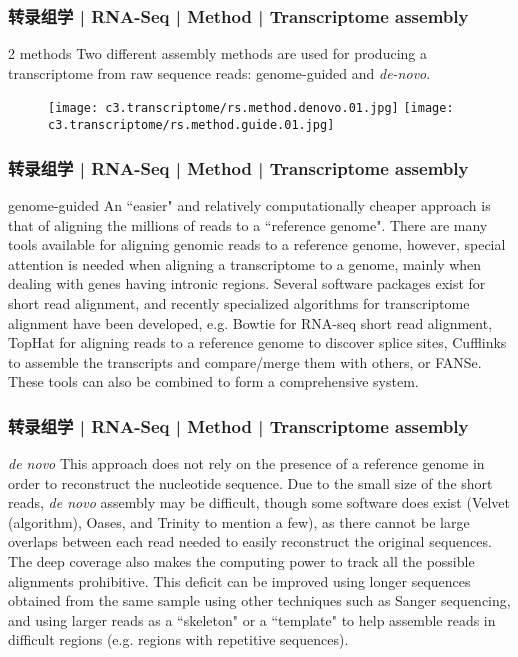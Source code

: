 \begin{frame}
  \frametitle{转录组学 | RNA-Seq | Method | Transcriptome assembly}
  \begin{block}{2 methods}
    Two different assembly methods are used for producing a transcriptome from raw sequence reads: genome-guided and \textit{de-novo}. 
  \end{block}
  \begin{figure}
    \centering
    \texttt{[image: c3.transcriptome/rs.method.denovo.01.jpg]} \quad
    \texttt{[image: c3.transcriptome/rs.method.guide.01.jpg]}
  \end{figure}
\end{frame}

\begin{frame}
  \frametitle{转录组学 | RNA-Seq | Method | Transcriptome assembly}
  \begin{block}{genome-guided}
    An ``easier" and relatively computationally cheaper approach is that of aligning the millions of reads to a ``reference genome". There are many tools available for aligning genomic reads to a reference genome, however, special attention is needed when aligning a transcriptome to a genome, mainly when dealing with genes having intronic regions. Several software packages exist for short read alignment, and recently specialized algorithms for transcriptome alignment have been developed, e.g. Bowtie for RNA-seq short read alignment, TopHat for aligning reads to a reference genome to discover splice sites, Cufflinks to assemble the transcripts and compare/merge them with others, or FANSe. These tools can also be combined to form a comprehensive system.
  \end{block}
\end{frame}

\begin{frame}
  \frametitle{转录组学 | RNA-Seq | Method | Transcriptome assembly}
  \begin{block}{\textit{de novo}}
    This approach does not rely on the presence of a reference genome in order to reconstruct the nucleotide sequence. Due to the small size of the short reads, \textit{de novo} assembly may be difficult, though some software does exist (Velvet (algorithm), Oases, and Trinity to mention a few), as there cannot be large overlaps between each read needed to easily reconstruct the original sequences. The deep coverage also makes the computing power to track all the possible alignments prohibitive. This deficit can be improved using longer sequences obtained from the same sample using other techniques such as Sanger sequencing, and using larger reads as a ``skeleton" or a ``template" to help assemble reads in difficult regions (e.g. regions with repetitive sequences).
  \end{block}
\end{frame}

